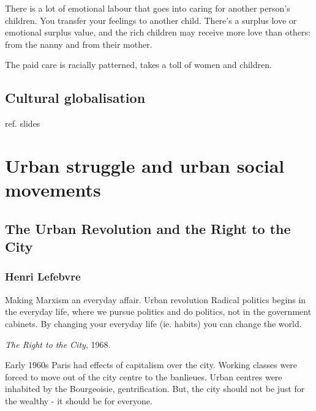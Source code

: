 \documentclass{article}
\begin{document}
There is a lot of emotional labour that goes into caring for another person's children. You transfer your feelings to another child. There's a surplus love or emotional surplus value, and the rich children may receive more love than others: from the nanny and from their mother.

The paid care is racially patterned, takes a toll of women and children.

\subsection{Cultural globalisation}

ref. slides 

\begin{outline}
	\1
\end{outline}


\section{Urban struggle and urban social movements}
\date{December 7th, 2021}

\subsection{The Urban Revolution and the Right to the City}

\subsubsection{Henri Lefebvre}

Making Marxism an everyday affair.
Urban revolution
Radical politics begins in the everyday life, where we pursue politics and do politics, not in the government cabinets. By changing your everyday life (ie. habits) you can change the world.

\textit{The Right to the City}, 1968.

Early 1960s Paris had effects of capitalism over the city. Working classes were forced to move out of the city centre to the banlieues. Urban centres were inhabited by the Bourgeoisie, gentrification. But, the city should not be just for the wealthy - it should be for everyone.
\end{document}
